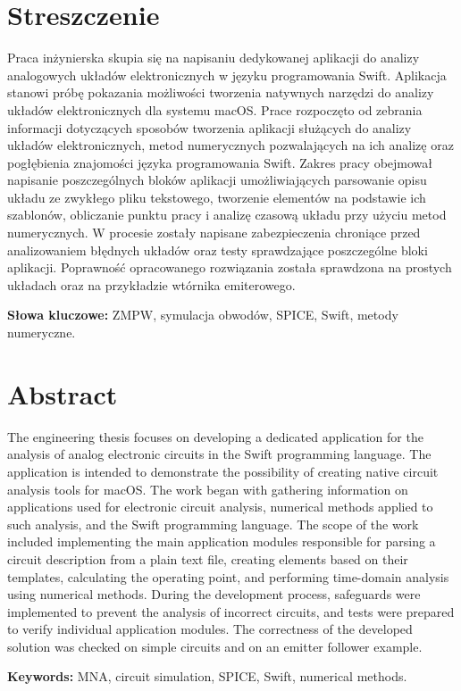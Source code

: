 \chapter*{Streszczenie}

Praca inżynierska skupia się na napisaniu dedykowanej aplikacji do analizy analogowych układów elektronicznych w języku programowania Swift. Aplikacja stanowi próbę pokazania możliwości tworzenia natywnych narzędzi do analizy układów elektronicznych dla systemu macOS. Prace rozpoczęto od zebrania informacji dotyczących sposobów tworzenia aplikacji służących do analizy układów elektronicznych, metod numerycznych pozwalających na ich analizę oraz pogłębienia znajomości języka programowania Swift. Zakres pracy obejmował napisanie poszczególnych bloków aplikacji umożliwiających parsowanie opisu układu ze zwykłego pliku tekstowego, tworzenie elementów na podstawie ich szablonów, obliczanie punktu pracy i analizę czasową układu przy użyciu metod numerycznych. W procesie zostały napisane zabezpieczenia chroniące przed analizowaniem błędnych układów oraz testy sprawdzające poszczególne bloki aplikacji. Poprawność opracowanego rozwiązania została sprawdzona na prostych układach oraz na przykładzie wtórnika emiterowego.

\vspace{4mm}
\noindent\textbf{Słowa kluczowe:} ZMPW, symulacja obwodów, SPICE, Swift, metody numeryczne.

\chapter*{Abstract}

The engineering thesis focuses on developing a dedicated application for the analysis of analog electronic circuits in the Swift programming language. The application is intended to demonstrate the possibility of creating native circuit analysis tools for macOS. The work began with gathering information on applications used for electronic circuit analysis, numerical methods applied to such analysis, and the Swift programming language. The scope of the work included implementing the main application modules responsible for parsing a circuit description from a plain text file, creating elements based on their templates, calculating the operating point, and performing time-domain analysis using numerical methods. During the development process, safeguards were implemented to prevent the analysis of incorrect circuits, and tests were prepared to verify individual application modules. The correctness of the developed solution was checked on simple circuits and on an emitter follower example.

\vspace{4mm}
\noindent\textbf{Keywords:} MNA, circuit simulation, SPICE, Swift, numerical methods.
